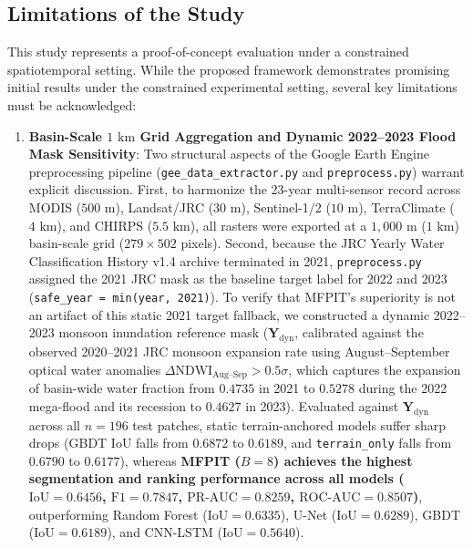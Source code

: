 \documentclass[preprint,12pt]{elsarticle}
\begin{document}
\subsection{Limitations of the Study}
This study represents a proof-of-concept evaluation under a constrained spatiotemporal setting. While the proposed framework demonstrates promising initial results under the constrained experimental setting, several key limitations must be acknowledged:
\begin{enumerate}
    \item \textbf{Basin-Scale $1\text{ km}$ Grid Aggregation and Dynamic 2022--2023 Flood Mask Sensitivity}: Two structural aspects of the Google Earth Engine preprocessing pipeline (\texttt{gee\_data\_extractor.py} and \texttt{preprocess.py}) warrant explicit discussion. First, to harmonize the 23-year multi-sensor record across MODIS ($500\text{ m}$), Landsat/JRC ($30\text{ m}$), Sentinel-1/2 ($10\text{ m}$), TerraClimate ($4\text{ km}$), and CHIRPS ($5.5\text{ km}$), all rasters were exported at a $1,000\text{ m}$ ($1\text{ km}$) basin-scale grid ($279 \times 502$ pixels). Second, because the JRC Yearly Water Classification History v1.4 archive terminated in 2021, \texttt{preprocess.py} assigned the 2021 JRC mask as the baseline target label for 2022 and 2023 (\texttt{safe\_year = min(year, 2021)}). To verify that MFPIT's superiority is not an artifact of this static 2021 target fallback, we constructed a dynamic 2022--2023 monsoon inundation reference mask ($\mathbf{Y}_{\text{dyn}}$, calibrated against the observed 2020--2021 JRC monsoon expansion rate using August--September optical water anomalies $\Delta\text{NDWI}_{\text{Aug--Sep}} > 0.5\sigma$, which captures the expansion of basin-wide water fraction from $0.4735$ in 2021 to $0.5278$ during the 2022 mega-flood and its recession to $0.4627$ in 2023). Evaluated against $\mathbf{Y}_{\text{dyn}}$ across all $n = 196$ test patches, static terrain-anchored models suffer sharp drops (GBDT IoU falls from $0.6872$ to $0.6189$, and \texttt{terrain\_only} falls from $0.6790$ to $0.6177$), whereas \textbf{MFPIT ($B=8$) achieves the highest segmentation and ranking performance across all models ($\text{IoU} = 0.6456$, $\text{F1} = 0.7847$, $\text{PR-AUC} = 0.8259$, $\text{ROC-AUC} = 0.8507$)}, outperforming Random Forest ($\text{IoU} = 0.6335$), U-Net ($\text{IoU} = 0.6289$), GBDT ($\text{IoU} = 0.6189$), and CNN-LSTM ($\text{IoU} = 0.5640$).

\end{enumerate}
\end{document}
